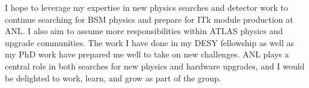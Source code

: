 \documentclass[a4paper]{article}
\begin{document}

I hope to leverage my expertise in new physics searches and detector work to continue searching for BSM physics and prepare for ITk
module production at ANL. I also aim to assume more responsibilities within ATLAS physics and upgrade communities. The work I have done
in my DESY fellowship as well as my PhD work have prepared me well to take on new challenges.
ANL plays a central role in both searches for new physics and hardware upgrades, and I would be delighted to work,
learn, and grow as part of the group.



%
\end{document}
